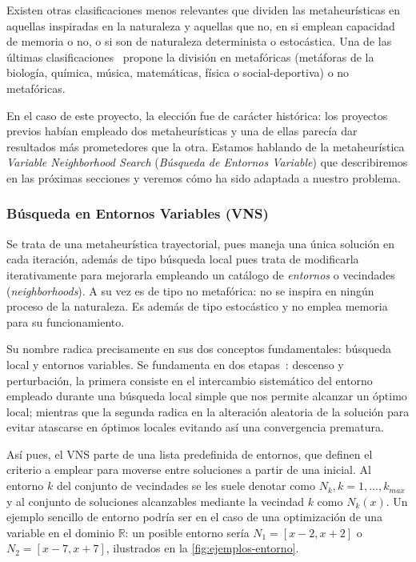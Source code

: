 Existen otras clasificaciones menos relevantes que dividen las metaheurísticas en aquellas inspiradas en la naturaleza y aquellas que no, en si emplean capacidad de memoria o no, o si son de naturaleza determinista o estocástica. Una de las últimas clasificaciones~\cite{sota:metaheuristicas} propone la división en metafóricas (metáforas de la biología, química, música, matemáticas, física o social-deportiva) o no metafóricas.

En el caso de este proyecto, la elección fue de carácter histórica: los proyectos previos habían empleado dos metaheurísticas y una de ellas parecía dar resultados más prometedores que la otra. Estamos hablando de la metaheurística \textit{Variable Neighborhood Search} (\textit{Búsqueda de Entornos Variable}) que describiremos en las próximas secciones y veremos cómo ha sido adaptada a nuestro problema.

\subsubsection{Búsqueda en Entornos Variables (VNS)}
Se trata de una metaheurística trayectorial, pues maneja una única solución en cada iteración, además de tipo búsqueda local pues trata de modificarla iterativamente para mejorarla empleando un catálogo de \textit{entornos} o vecindades (\textit{neighborhoods}). A su vez es de tipo no metafórica: no se inspira en ningún proceso de la naturaleza. Es además de tipo estocástico y no emplea memoria para su funcionamiento.

Su nombre radica precisamente en sus dos conceptos fundamentales: búsqueda local y entornos variables. Se fundamenta en dos etapas~\cite{vns}: descenso y perturbación, la primera consiste en el intercambio sistemático del entorno empleado durante una búsqueda local simple que nos permite alcanzar un óptimo local; mientras que la segunda radica en la alteración aleatoria de la solución para evitar atascarse en óptimos locales evitando así una convergencia prematura.

Así pues, el VNS parte de una lista predefinida de entornos, que definen el criterio a emplear para moverse entre soluciones a partir de una inicial. Al entorno $k$ del conjunto de vecindades se les suele denotar como $N_k, k=1,...,k_{max}$ y al conjunto de soluciones alcanzables mediante la vecindad $k$ como $N_k(x)$.
Un ejemplo sencillo de entorno podría ser en el caso de una optimización de una variable en el dominio $\mathbb{R}$: un posible entorno sería $N_1=[x-2, x+2]$ o $N_2=[x-7, x+7]$, ilustrados en la \autoref{fig:ejemplos-entorno}.

